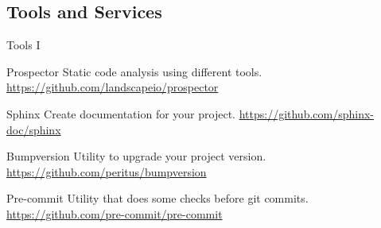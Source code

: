 \subsection{Tools and Services}
\begin{frame}{Tools I}
    \begin{block}{Prospector}
        Static code analysis using different tools.
        \href{https://github.com/landscapeio/prospector}{https://github.com/landscapeio/prospector}
    \end{block}
    \pause
    \begin{block}{Sphinx}
        Create documentation for your project.
        \href{https://github.com/sphinx-doc/sphinx}{https://github.com/sphinx-doc/sphinx}
    \end{block}
    \pause
    \begin{block}{Bumpversion}
        Utility to upgrade your project version.
        \href{https://github.com/peritus/bumpversion}{https://github.com/peritus/bumpversion}
    \end{block}
    \pause
    \begin{block}{Pre-commit}
        Utility that does some checks before git commits.
        \href{https://github.com/pre-commit/pre-commit}{https://github.com/pre-commit/pre-commit}
    \end{block}
\end{frame}
